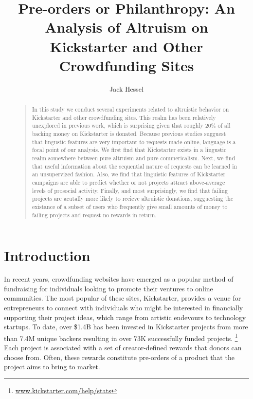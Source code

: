 \documentclass[letterpaper]{article}
\begin{document}
%
\title{Pre-orders or Philanthropy: An Analysis of Altruism on Kickstarter and Other Crowdfunding Sites}
\author{Jack Hessel}
\maketitle
\begin{abstract}
\begin{quote}
In this study we conduct several experiments related to altruistic behavior on Kickstarter and other crowdfunding sites. This realm has been relatively unexplored in previous work, which is surprising given that roughly 20\% of all backing money on Kickstarter is donated. Because previous studies sugguest that lingustic features are very important to requests made online, language is a focal point of our analysis. We first find that Kickstarter exists in a lingustic realm somewhere between pure altruism and pure commericalism. Next, we find that useful information about the sequential nature of requests can be learned in an unsupervized fashion. Also, we find that linguistic features of Kickstarter campaigns are able to predict whether or not projects attract above-average levels of prosocial activity. Finally, and most surprisingly, we find that failing projects are acutally more likely to recieve altruistic donations, sugguesting the existance of a subset of users who frequently give small amounts of money to failing projects and request no rewards in return.
\end{quote}
\end{abstract}

\section{Introduction}

In recent years, crowdfunding websites have emerged as a popular method of fundraising for individuals looking to promote their ventures to online communities. The most popular of these sites, Kickstarter, provides a venue for entrepreneurs to connect with individuals who might be interested in financially supporting their project ideas, which range from artistic endevours to technology startups. To date, over \$1.4B has been invested in Kickstarter projects from more than 7.4M unique backers resulting in over 73K successfully funded projects. \footnote{ \url{www.kickstarter.com/help/stats}} Each project is associated with a set of creator-defined rewards that donors can choose from. Often, these rewards constitute pre-orders of a product that the project aims to bring to market.
\end{document}

